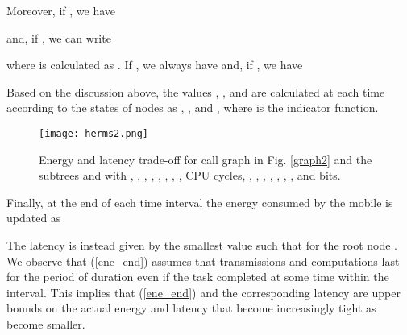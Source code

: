 \documentclass[journal,twocolumn,10pt,twoside]{IEEEtranTCOM}
\theoremstyle{plain}
\theoremstyle{plain}
\theoremstyle{remark}
\begin{document}
Moreover, if , we have

and, if , we can write

where  is calculated as . If , we always have  and,
if , we have



Based on the discussion above, the values , ,  and  are calculated at each time  according to the states of nodes as
, ,  and ,
where  is the indicator function.

\begin{figure}
\centering
\texttt{[image: herms2.png]}
\caption{Energy and latency trade-off for call graph  in Fig. \ref{graph2} and the subtrees  and  with , , , , , , , ,   CPU cycles, , , , , , , ,  and  bits.}\label{dep}
\vspace{-1.5em}
\end{figure}
Finally, at the end of each time interval  the energy consumed by the mobile is updated as

The latency is instead given by the smallest value  such that  for the root node . We observe that (\ref{ene_end}) assumes that transmissions and computations last for the period of duration  even if the task completed at some time within the interval. This implies that (\ref{ene_end}) and the corresponding latency are upper bounds on the actual energy and latency that become increasingly tight as  become smaller.




\end{document}
